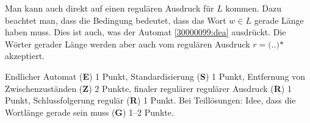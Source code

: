 \begin{loesung}
Man kann auch direkt auf einen regulären Ausdruck für $L$ kommen.
Dazu beachtet man, dass die Bedingung bedeutet, dass das Wort $w\in L$
gerade Länge haben muss.
Dies ist auch, was der Automat \eqref{30000099:dea} ausdrückt.
Die Wörter gerader Länge werden aber auch vom regulären Ausdruck
$r=\texttt{(..)*}$ akzeptiert.
\end{loesung}

\begin{bewertung}
Endlicher Automat ({\bf E}) 1 Punkt,
Standardisierung ({\bf S}) 1 Punkt,
Entfernung von Zwischenzuständen ({\bf Z}) 2 Punkte,
finaler regulärer regulärer Ausdruck ({\bf R}) 1 Punkt,
Schlussfolgerung regulär ({\bf R}) 1 Punkt.
Bei Teillösungen: Idee, dass die Wortlänge gerade sein muss ({\bf G})
1--2 Punkte.
\end{bewertung}
